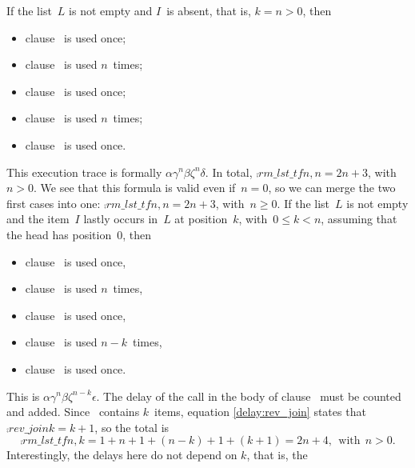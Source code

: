 \noindent If the list~\(L\) is not empty and \(I\)~is absent, that is,
\(k = n > 0\), then
\begin{itemize}

  \item clause~\clause{\alpha} is used once;

  \item clause~\clause{\gamma} is used \(n\)~times;

  \item clause~\clause{\beta} is used once;

  \item clause~\clause{\zeta} is used \(n\)~times;

  \item clause~\clause{\delta} is used once.

\end{itemize}
This execution trace is formally \(\alpha\gamma^n\beta\zeta^n\delta\).
In total, \(\comp{rm\_lst\_tf}{n,n} = 2n + 3\), with~\(n > 0\). We see
that this formula is valid even if~\(n=0\), so we can merge the two
first cases into one: \(\comp{rm\_lst\_tf}{n,n} = 2n + 3\), with~\(n
\geqslant 0\). If the list~\(L\) is not empty and the item~\(I\)
lastly occurs in~\(L\) at position~\(k\), with~\(0 \leqslant k < n\),
assuming that the head has position~\(0\), then
\begin{itemize}

  \item clause~\clause{\alpha} is used once,

  \item clause~\clause{\gamma} is used \(n\)~times,

  \item clause~\clause{\beta} is used once,

  \item clause~\clause{\zeta} is used \(n-k\)~times,

  \item clause~\clause{\epsilon} is used once.

\end{itemize}
This is \(\alpha\gamma^n\beta\zeta^{n-k}\epsilon\). The delay of the
call  in the body of clause~\clause{\epsilon}
must be counted and added. Since ~contains \(k\)~items,
equation \eqref{delay:rev_join}  states that
\(\comp{rev\_join}{k} = k + 1\), so the total is
\[
\comp{rm\_lst\_tf}{n,k} = 1 + n + 1 + (n-k) + 1 + (k+1) = 2n + 4,\,\;
\text{with} \,\; n > 0.
\]
Interestingly, the delays here do not depend on \(k\), that is, the
